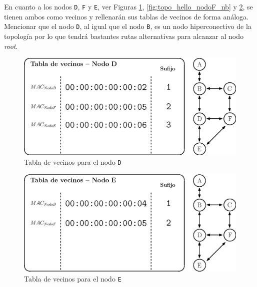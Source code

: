 En cuanto a los nodos \texttt{D}, \texttt{F} y \texttt{E}, ver Figuras \ref{fig:topo_hello_nodoD_nb}, \ref{fig:topo_hello_nodoF_nb} y \ref{fig:topo_hello_nodoE_nb}, se tienen ambos como vecinos y rellenarán sus tablas de vecinos de forma análoga. Mencionar que el nodo \texttt{D}, al igual que el nodo \texttt{B}, es un nodo hiperconectivo de la topología por lo que tendrá bastantes rutas alternativas para alcanzar al nodo \textit{root}.\\


\begin{figure}[ht!]
    \centering
    \includegraphics[width=\textwidth]{archivos/img/dev/topo_hello_nodoD_nb.eps}
    \caption{Tabla de vecinos para el nodo \texttt{D}}
    \label{fig:topo_hello_nodoD_nb}
\end{figure}


\begin{figure}[ht!]
    \centering
    \includegraphics[width=\textwidth]{archivos/img/dev/topo_hello_nodoE_nb.eps}
    \caption{Tabla de vecinos para el nodo \texttt{E}}
    \label{fig:topo_hello_nodoE_nb}
\end{figure}


